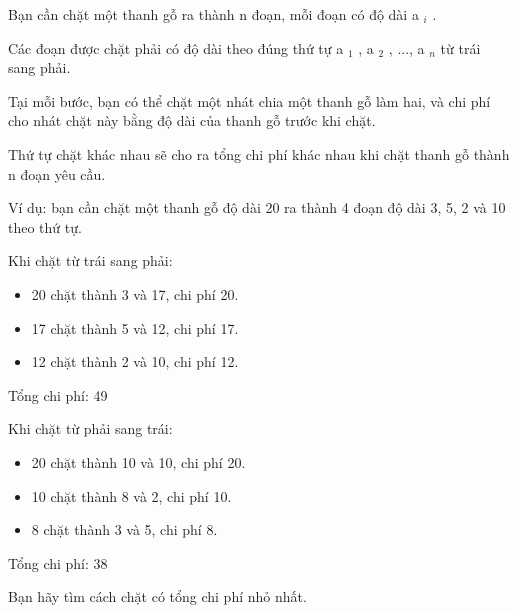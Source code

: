 Bạn cần chặt một thanh gỗ ra thành n đoạn, mỗi đoạn có độ dài a $_ i $ .

Các đoạn được chặt phải có độ dài theo đúng thứ tự a $_ 1 $ , a $_ 2 $ , ..., a $_ n $ từ trái sang phải.

Tại mỗi bước, bạn có thể chặt một nhát chia một thanh gỗ làm hai, và chi phí cho nhát chặt này bằng độ dài của thanh gỗ trước khi chặt.

Thứ tự chặt khác nhau sẽ cho ra tổng chi phí khác nhau khi chặt thanh gỗ thành n đoạn yêu cầu.

Ví dụ: bạn cần chặt một thanh gỗ độ dài 20 ra thành 4 đoạn độ dài 3, 5, 2 và 10 theo thứ tự.

Khi chặt từ trái sang phải:
\begin{itemize}
	\item 20 chặt thành 3 và 17, chi phí 20.
	\item 17 chặt thành 5 và 12, chi phí 17.
	\item 12 chặt thành 2 và 10, chi phí 12.
\end{itemize}

Tổng chi phí: 49

Khi chặt từ phải sang trái:
\begin{itemize}
	\item 20 chặt thành 10 và 10, chi phí 20.
	\item 10 chặt thành 8 và 2, chi phí 10.
	\item 8 chặt thành 3 và 5, chi phí 8.
\end{itemize}

Tổng chi phí: 38

Bạn hãy tìm cách chặt có tổng chi phí nhỏ nhất.